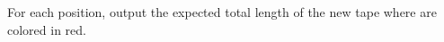 For each position, output the expected total length of the new tape where are
colored in red.
\newpage
